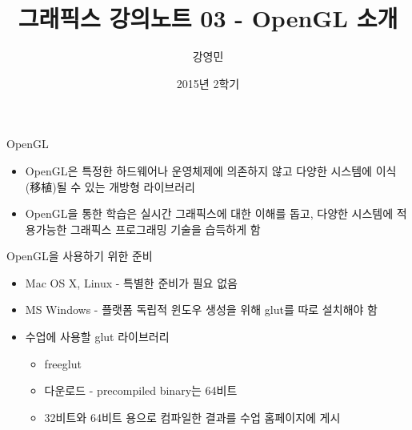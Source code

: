 \documentclass{beamer}
\title[3D 그래픽스 프로그래밍]{그래픽스 강의노트 03 - OpenGL 소개}
\author{강영민}
\institute{동명대학교}
\date{2015년 2학기}
\begin{document}
\begin{frame}
  \titlepage
\end{frame}



\begin{frame}{OpenGL}

\begin{itemize}
\item OpenGL은 특정한 하드웨어나 운영체제에 의존하지 않고 다양한 시스템에 이식(移植)될 수 있는 개방형 라이브러리
\item OpenGL을 통한 학습은 실시간 그래픽스에 대한 이해를 돕고, 다양한 시스템에 적용가능한 그래픽스 프로그래밍 기술을 습득하게 함
\end{itemize}
\end{frame}

\begin{frame}{OpenGL을 사용하기 위한 준비}

\begin{itemize}
\item Mac OS X, Linux - 특별한 준비가 필요 없음
\item MS Windows - 플랫폼 독립적 윈도우 생성을 위해 glut를 따로 설치해야 함
\end{itemize}


\begin{itemize}
\item 수업에 사용할 glut 라이브러리
	\begin{itemize}
	\item freeglut
	\item 다운로드 - precompiled binary는 64비트 
	\item 32비트와 64비트 용으로 컴파일한 결과를 수업 홈페이지에 게시
	\end{itemize}
\end{itemize}

\end{frame}
\end{document}
